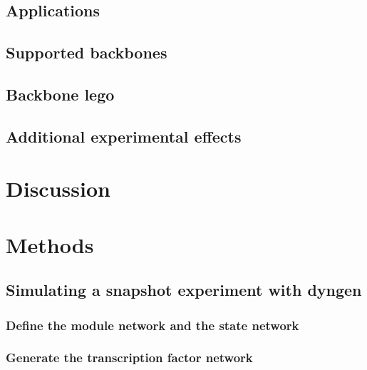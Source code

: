%
%

\subsection{Applications}

\subsection{Supported backbones}

\subsection{Backbone lego}

\subsection{Additional experimental effects}


\section{Discussion}

\section{Methods}

\subsection{Simulating a snapshot experiment with dyngen}
\subsubsection{Define the module network and the state network}
\subsubsection{Generate the transcription factor network}
